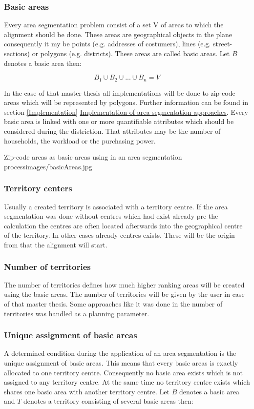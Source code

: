 \subsubsection{Basic areas}
Every area segmentation problem consist of a set V of areas to which the alignment should be done. These areas are geographical objects in the plane consequently it my be points (e.g. addresses of costumers), lines (e.g. street-sections) or polygons (e.g. districts). These areas are called basic areas. Let $ B $ denotes a basic area then:

\[ \mathit{B_{1} \cup B_{2} \cup ... \cup B_{n}=V} \]

In the case of that master thesis all implementations will be done to zip-code areas which will be represented by polygons. Further information can be found in section \ref{Implementation} \hyperref[Implementation]{Implementation of area segmentation approaches}. Every basic area is linked with one or more quantifiable attributes which should be considered during the distriction. That attributes may be the number of households, the workload or the purchasing power.

\begin{figureOwn}{Zip-code areas as basic areas using in an area segmentation process}{images/basicAreas.jpg}\end{figureOwn}

\subsubsection{Territory centers}
Usually a created territory is associated with a territory centre. If the area segmentation was done without centres which had exist already pre the 
calculation the centres are often located afterwards into the geographical centre of the territory. In other cases already centres exists. These will be the origin from that the alignment will start. 

\subsubsection{Number of territories}
The number of territories defines how much higher ranking areas will be created using the basic areas. The number of territories will be given by the user in case of that master thesis. Some approaches like it was done in \citeauthor{kalcsics} \cite{kalcsics} the number of territories was handled as a planning parameter.

\subsubsection{Unique assignment of basic areas}
A determined condition during the application of an area segmentation is the unique assignment of basic areas. This means that every basic areas is exactly allocated to one territory centre. Consequently no basic area exists which is not assigned to any territory centre. At the same time no territory centre exists which shares one basic area with another territory centre. Let $ B $ denotes a basic area and $ T $ denotes a territory consisting of several basic areas then:

